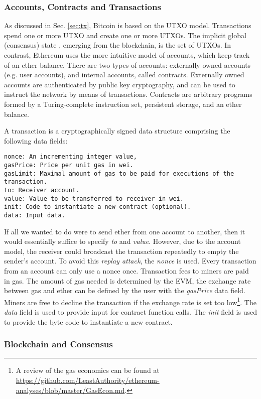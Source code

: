 \subsubsection{Accounts, Contracts and Transactions}
\label{sec:ethereum:tech:tx}
As discussed in Sec. \ref{sec:tx}, Bitcoin is based on the \ac{UTXO} model. Transactions spend one or more \ac{UTXO} and create one or more \ac{UTXO}s. The implicit global (consensus) state , emerging from the blockchain, is the set of \ac{UTXO}s. In contrast, Ethereum uses the more intuitive model of accounts, which keep track of an ether balance. There are two types of accounts: externally owned accounts (e.g. user accounts), and internal accounts, called contracts. Externally owned accounts are authenticated by public key cryptography, and can be used to instruct the network by means of transactions. Contracts are arbitrary programs formed by a Turing-complete instruction set, persistent storage, and an ether balance. 

A transaction is a cryptographically signed data structure comprising the following data fields:
\begin{lstlisting}[breaklines]
nonce: An incrementing integer value,
gasPrice: Price per unit gas in wei.
gasLimit: Maximal amount of gas to be paid for executions of the transaction.
to: Receiver account.
value: Value to be transferred to receiver in wei.
init: Code to instantiate a new contract (optional).
data: Input data. 
\end{lstlisting}
If all we wanted to do were to send ether from one account to another, then it would essentially suffice to specify \emph{to} and \emph{value}. However, due to the account model, the receiver could broadcast the transaction repeatedly to empty the sender's account. To avoid this \emph{replay attack}, the \emph{nonce} is used. Every transaction from an account can only use a nonce once. Transaction fees to miners are paid in gas. The amount of gas needed is determined by the \ac{EVM}, the exchange rate between gas and ether can be defined by the user with the \emph{gasPrice} data field. Miners are free to decline the transaction if the exchange rate is set too low\footnote{A review of the gas economics can be found at \url{https://github.com/LeastAuthority/ethereum-analyses/blob/master/GasEcon.md}.}. The \emph{data} field is used to provide input for contract function calls. The \emph{init} field is used to provide the byte code to instantiate a new contract.

\subsubsection{Blockchain and Consensus}
\label{sec:eth_blockchain}


